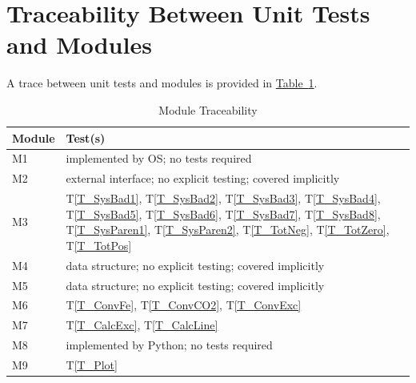 \documentclass[12pt, titlepage]{article}
\newcommand{\testref}[1]{T\ref{#1}}
\begin{document}

\newpage
\section{Traceability Between Unit Tests and Modules}
A trace between unit tests and modules is provided in 
\hyperref[tab:modtrace]{Table~\ref*{tab:modtrace}}.

\begin{table}[h]
\caption{Module Traceability} \label{tab:modtrace}
\centering
\begin{tabularx}{0.90\textwidth}{lX}
\toprule {\bf Module} & {\bf Test(s)}\\
\midrule
M1 & implemented by OS; no tests required\\
M2 & external interface; no explicit testing; covered implicitly\\
M3 & \testref{T_SysBad1}, \testref{T_SysBad2}, \testref{T_SysBad3}, 
\testref{T_SysBad4}, \testref{T_SysBad5}, \testref{T_SysBad6}, 
\testref{T_SysBad7}, \testref{T_SysBad8}, \testref{T_SysParen1},
\testref{T_SysParen2}, \testref{T_TotNeg}, \testref{T_TotZero},
\testref{T_TotPos} \\
M4 & data structure; no explicit testing; covered implicitly\\
M5 & data structure; no explicit testing; covered implicitly\\
M6 & \testref{T_ConvFe}, \testref{T_ConvCO2}, \testref{T_ConvExc}\\
M7 & \testref{T_CalcExc}, \testref{T_CalcLine}\\
M8 & implemented by Python; no tests required\\
M9 & \testref{T_Plot}\\
\bottomrule
\end{tabularx}
\end{table}

%

\end{document}
